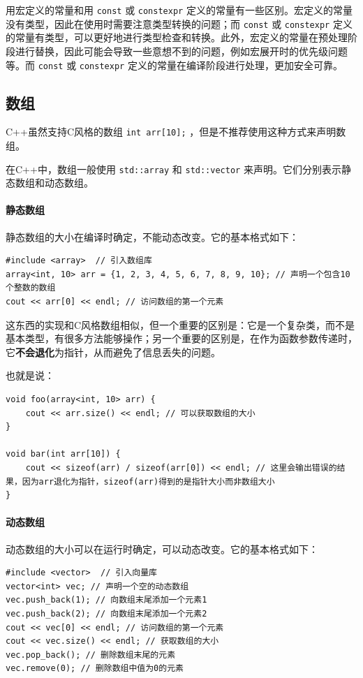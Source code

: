 \begin{tip}
  用宏定义的常量和用 \texttt{const} 或 \texttt{constexpr} 定义的常量有一些区别。宏定义的常量没有类型，因此在使用时需要注意类型转换的问题；而 \texttt{const} 或 \texttt{constexpr} 定义的常量有类型，可以更好地进行类型检查和转换。此外，宏定义的常量在预处理阶段进行替换，因此可能会导致一些意想不到的问题，例如宏展开时的优先级问题等。而 \texttt{const} 或 \texttt{constexpr} 定义的常量在编译阶段进行处理，更加安全可靠。
\end{tip}

\subsection{数组}

C++虽然支持C风格的数组 \texttt{int arr[10];}  ，但是不推荐使用这种方式来声明数组。

在C++中，数组一般使用 \texttt{std::array} 和 \texttt{std::vector} 来声明。它们分别表示静态数组和动态数组。

\paragraph{静态数组}

静态数组的大小在编译时确定，不能动态改变。它的基本格式如下：
\begin{verbatim}
#include <array>  // 引入数组库
array<int, 10> arr = {1, 2, 3, 4, 5, 6, 7, 8, 9, 10}; // 声明一个包含10个整数的数组
cout << arr[0] << endl; // 访问数组的第一个元素
\end{verbatim}

这东西的实现和C风格数组相似，但一个重要的区别是：它是一个复杂类，而不是基本类型，有很多方法能够操作；另一个重要的区别是，在作为函数参数传递时，它\textbf{不会退化}为指针，从而避免了信息丢失的问题。

也就是说：
\begin{verbatim}
void foo(array<int, 10> arr) {
    cout << arr.size() << endl; // 可以获取数组的大小
}

void bar(int arr[10]) {
    cout << sizeof(arr) / sizeof(arr[0]) << endl; // 这里会输出错误的结果，因为arr退化为指针，sizeof(arr)得到的是指针大小而非数组大小
}
\end{verbatim}

\paragraph{动态数组}

动态数组的大小可以在运行时确定，可以动态改变。它的基本格式如下：
\begin{verbatim}
#include <vector>  // 引入向量库
vector<int> vec; // 声明一个空的动态数组
vec.push_back(1); // 向数组末尾添加一个元素1
vec.push_back(2); // 向数组末尾添加一个元素2
cout << vec[0] << endl; // 访问数组的第一个元素
cout << vec.size() << endl; // 获取数组的大小
vec.pop_back(); // 删除数组末尾的元素
vec.remove(0); // 删除数组中值为0的元素
\end{verbatim}

